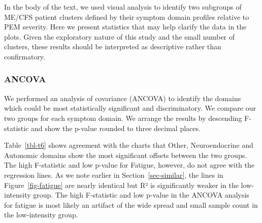 \documentclass[
  letterpaper,
  DIV=11,
  numbers=noendperiod]{scrartcl}
\begin{document}
In the body of the text, we used visual analysis to identify two
subgroups of ME/CFS patient clusters defined by their symptom domain
profiles relative to PEM severity. Here we present statistics that may
help clarify the data in the plots. Given the exploratory nature of this
study and the small number of clusters, these results should be
interpreted as descriptive rather than confirmatory.

\bigskip

\subsubsection*{ANCOVA}\label{sec-ancova}

We performed an analysis of covariance (ANCOVA) to identify the domains
which could be most statistically significant and discriminatory. We
compare our two groups for each symptom domain. We arrange the results
by descending F-statistic and show the p-value rounded to three decimal
places.

\FloatBarrier

\begin{table}[h]

\caption{\label{tbl-t6}ANCOVA Analysis}


\end{table}%

Table~\ref{tbl-t6} shows agreement with the charts that Other,
Neuroendocrine and Autonomic domains show the most significant offsets
between the two groups. The high F-statistic and low p-value for
Fatigue, however, do not agree with the regression lines. As we note
earlier in Section~\ref{sec-similar}, the lines in
Figure~\ref{fig-fatigue} are nearly identical but R² is significantly
weaker in the low-intensity group. The high F-statistic and low p-value
in the ANCOVA analysis for fatigue is most likely an artifact of the
wide spread and small sample count in the low-intensity group.
\end{document}
